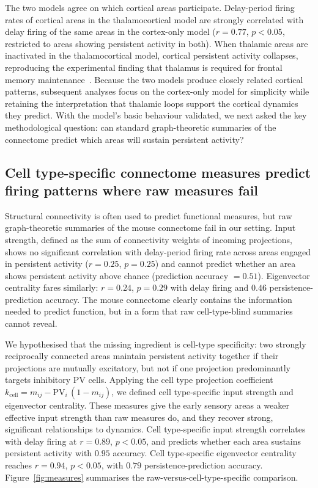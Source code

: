 \documentclass[11pt]{article}
\begin{document}
The two models agree on which cortical areas participate. Delay-period firing rates of cortical areas in the thalamocortical model are strongly correlated with delay firing of the same areas in the cortex-only model ($r=0.77$, $p<0.05$, restricted to areas showing persistent activity in both). When thalamic areas are inactivated in the thalamocortical model, cortical persistent activity collapses, reproducing the experimental finding that thalamus is required for frontal memory maintenance~\cite{guo2017maintenance}. Because the two models produce closely related cortical patterns, subsequent analyses focus on the cortex-only model for simplicity while retaining the interpretation that thalamic loops support the cortical dynamics they predict. With the model's basic behaviour validated, we next asked the key methodological question: can standard graph-theoretic summaries of the connectome predict which areas will sustain persistent activity?

\subsection{Cell type-specific connectome measures predict firing patterns where raw measures fail}

Structural connectivity is often used to predict functional measures, but raw graph-theoretic summaries of the mouse connectome fail in our setting. Input strength, defined as the sum of connectivity weights of incoming projections, shows no significant correlation with delay-period firing rate across areas engaged in persistent activity ($r=0.25$, $p=0.25$) and cannot predict whether an area shows persistent activity above chance (prediction accuracy $=0.51$). Eigenvector centrality fares similarly: $r=0.24$, $p=0.29$ with delay firing and $0.46$ persistence-prediction accuracy. The mouse connectome clearly contains the information needed to predict function, but in a form that raw cell-type-blind summaries cannot reveal.

We hypothesised that the missing ingredient is cell-type specificity: two strongly reciprocally connected areas maintain persistent activity together if their projections are mutually excitatory, but not if one projection predominantly targets inhibitory PV cells. Applying the cell type projection coefficient $k_{\text{cell}} = m_{ij} - \mathrm{PV}_i\,(1-m_{ij})$, we defined cell type-specific input strength and eigenvector centrality. These measures give the early sensory areas a weaker effective input strength than raw measures do, and they recover strong, significant relationships to dynamics. Cell type-specific input strength correlates with delay firing at $r=0.89$, $p<0.05$, and predicts whether each area sustains persistent activity with $0.95$ accuracy. Cell type-specific eigenvector centrality reaches $r=0.94$, $p<0.05$, with $0.79$ persistence-prediction accuracy. Figure~\ref{fig:measures} summarises the raw-versus-cell-type-specific comparison.
\end{document}
